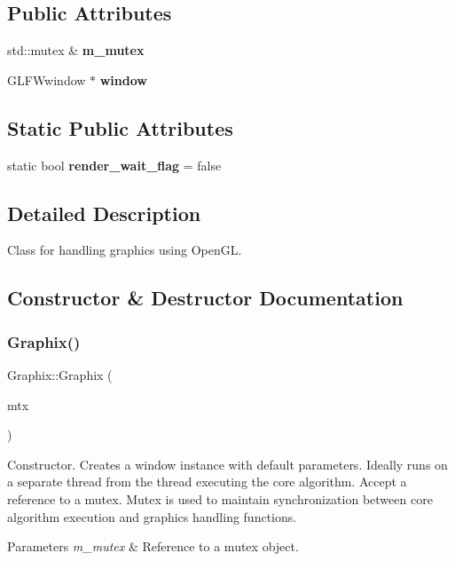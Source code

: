 \subsection*{Public Attributes}
\begin{DoxyCompactItemize}
\item 
\mbox{\label{classGraphix_ab2136667d30ca5f0017bceded579a803}} 
std\+::mutex \& {\bfseries m\+\_\+mutex}
\item 
\mbox{\label{classGraphix_a8189df95428d2fda74b1becb84ed07c2}} 
G\+L\+F\+Wwindow $\ast$ {\bfseries window}
\end{DoxyCompactItemize}
\subsection*{Static Public Attributes}
\begin{DoxyCompactItemize}
\item 
\mbox{\label{classGraphix_abfd52cde22d5ea3f3b159cc4d5569853}} 
static bool {\bfseries render\+\_\+wait\+\_\+flag} = false
\end{DoxyCompactItemize}


\subsection{Detailed Description}
Class for handling graphics using Open\+GL. 

\subsection{Constructor \& Destructor Documentation}
\mbox{\label{classGraphix_a1d4cb173e0d22fee13a657489b7b55de}} 
\subsubsection{\texorpdfstring{Graphix()}{Graphix()}}
{\footnotesize\ttfamily Graphix\+::\+Graphix (\begin{DoxyParamCaption}\item[{std\+::mutex \&}]{mtx }\end{DoxyParamCaption})}

Constructor. Creates a window instance with default parameters. Ideally runs on a separate thread from the thread executing the core algorithm. Accept a reference to a mutex. Mutex is used to maintain synchronization between core algorithm execution and graphics handling functions. 
\begin{DoxyParams}{Parameters}
{\em m\+\_\+mutex} & Reference to a mutex object. \\
\hline
\end{DoxyParams}


